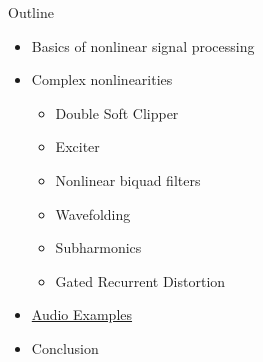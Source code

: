 \begin{frame}{Outline}
    \begin{itemize}
        \setlength\itemsep{0.8em}
        \item Basics of nonlinear signal processing
        \item Complex nonlinearities
        \begin{itemize}
            \item Double Soft Clipper
            \item Exciter
            \item Nonlinear biquad filters
            \item Wavefolding
            \item Subharmonics
            \item Gated Recurrent Distortion
        \end{itemize}
        \item \href{https://www.youtube.com/playlist?list=PLrcXtWXbPsj1SS-3zfcaiRpuETqMYy6Hw}{Audio Examples}
        \item Conclusion
    \end{itemize}
\end{frame}
